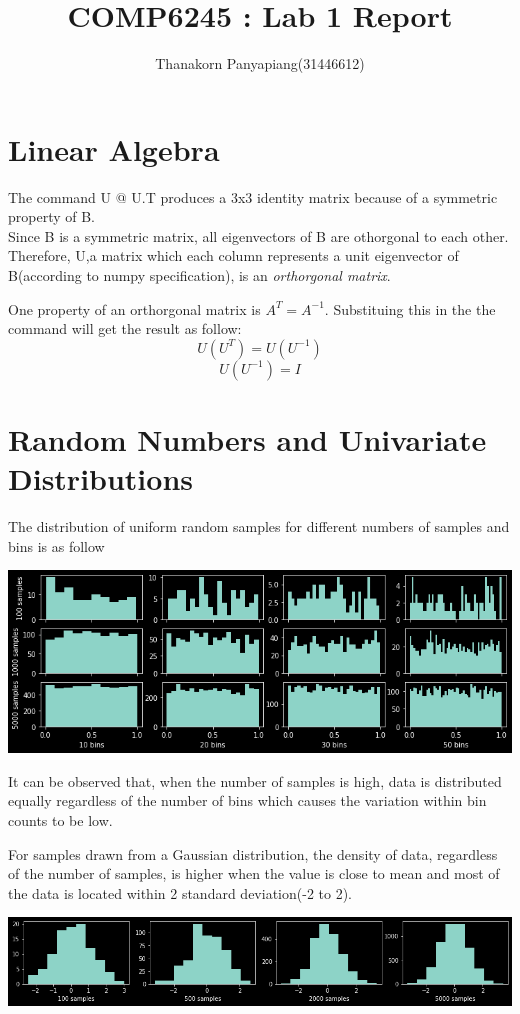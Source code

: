 \documentclass{article}
\title{COMP6245 : Lab 1 Report}
\author{Thanakorn Panyapiang(31446612)}
\begin{document}
\maketitle
\section{Linear Algebra}
The command U @ U.T produces a 3x3 identity matrix because of a symmetric property of B. \\
\indent Since B is a symmetric matrix, all eigenvectors of B are othorgonal to each other. Therefore, U,a matrix which each column represents a unit eigenvector of B(according to numpy specification), is an \textit{orthorgonal matrix}.

One property of an orthorgonal matrix is $A^T = A^{-1}$. Substituing this in the the command will get the result as follow:
\[U(U^T) = U(U^{-1})\]
\[U(U^{-1}) = I \] 

\maketitle
\section{Random Numbers and Univariate Distributions}
The distribution of uniform random samples for different numbers of samples and bins is as follow
\begin{center}
\includegraphics[scale=0.5]{uniform_random_numbers}
\end{center}
It can be observed that, when the number of samples is high, data is distributed equally regardless of the number of bins which causes the variation within bin counts to be low.

For samples drawn from a Gaussian distribution, the density of data, regardless of the number of samples, is higher when the value is close to mean and most of the data is located within 2 standard deviation(-2 to 2).
\begin{center}
\includegraphics[scale=0.4]{gaussian_random_numbers}
\end{center}
\end{document}

